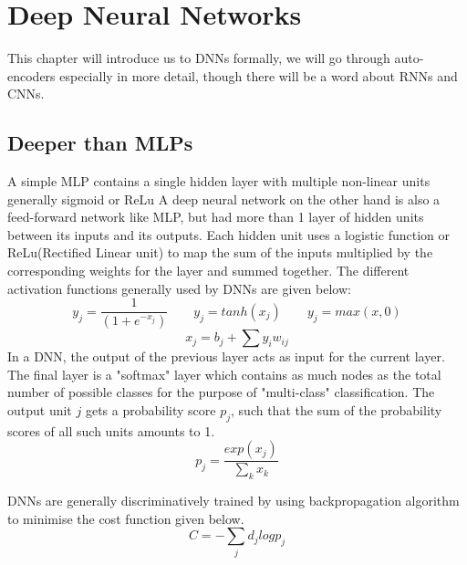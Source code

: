 \documentclass[a4paper,11pt]{kth-mag}
\begin{document}
\chapter{Deep Neural Networks}
This chapter will introduce us to DNNs formally, we will go through auto-encoders especially in more detail, though there will be a word about RNNs and CNNs.
\section{Deeper than MLPs}
A simple MLP contains a single hidden layer with multiple non-linear units generally sigmoid or ReLu
A deep neural network on the other hand is also a feed-forward network like MLP, but had more than 1 layer of hidden units between its inputs and its outputs. Each hidden unit uses a logistic function or ReLu(Rectified Linear unit) to map the sum of the inputs multiplied by the corresponding weights for the layer and summed together. The different activation functions generally used by DNNs are given below:
\begin{equation}
y_{j} = \frac{1}{(1 + e^{-x_{j}})}  \qquad y_{j} = tanh(x_{j}) \qquad y_{j} = max(x, 0)
\end{equation}
\begin{equation}
x_{j} = b_{j} + \sum{y_{i}w_{ij}}
\end{equation}
In a DNN, the output of the previous layer acts as input for the current layer. The final layer is a "softmax" layer which contains as much nodes as the total number of possible classes for the purpose of "multi-class" classification. The output unit $j$ gets a probability score $p_{j}$, such that the sum of the probability scores of all such units amounts to 1. 
\begin{equation}
p_{j} = \frac{exp(x_{j})}{\sum_{k}{x_{k}}} 
\end{equation}

DNNs are generally discriminatively trained by using backpropagation algorithm to minimise the cost function given below.
\begin{equation}
\textit{C} = -\sum_{j}{d_{j}logp_{j}}
\end{equation}
\end{document}
